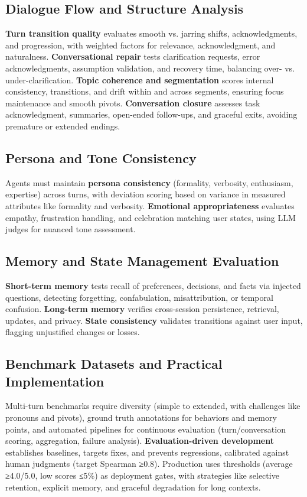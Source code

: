 \begin{TNtwocol}
\subsection*{Dialogue Flow and Structure Analysis}

\textbf{Turn transition quality} evaluates smooth vs. jarring shifts, acknowledgments, and progression, with weighted factors for relevance, acknowledgment, and naturalness. \textbf{Conversational repair} tests clarification requests, error acknowledgments, assumption validation, and recovery time, balancing over- vs. under-clarification. \textbf{Topic coherence and segmentation} scores internal consistency, transitions, and drift within and across segments, ensuring focus maintenance and smooth pivots. \textbf{Conversation closure} assesses task acknowledgment, summaries, open-ended follow-ups, and graceful exits, avoiding premature or extended endings.
​

\subsection*{Persona and Tone Consistency}

Agents must maintain \textbf{persona consistency} (formality, verbosity, enthusiasm, expertise) across turns, with deviation scoring based on variance in measured attributes like formality and verbosity. \textbf{Emotional appropriateness} evaluates empathy, frustration handling, and celebration matching user states, using LLM judges for nuanced tone assessment.
​

\subsection*{Memory and State Management Evaluation}

\textbf{Short-term memory} tests recall of preferences, decisions, and facts via injected questions, detecting forgetting, confabulation, misattribution, or temporal confusion. \textbf{Long-term memory} verifies cross-session persistence, retrieval, updates, and privacy. \textbf{State consistency} validates transitions against user input, flagging unjustified changes or losses.
​

\subsection*{Benchmark Datasets and Practical Implementation}

Multi-turn benchmarks require diversity (simple to extended, with challenges like pronouns and pivots), ground truth annotations for behaviors and memory points, and automated pipelines for continuous evaluation (turn/conversation scoring, aggregation, failure analysis). \textbf{Evaluation-driven development} establishes baselines, targets fixes, and prevents regressions, calibrated against human judgments (target Spearman ≥0.8). Production uses thresholds (average ≥4.0/5.0, low scores ≤5\%) as deployment gates, with strategies like selective retention, explicit memory, and graceful degradation for long contexts.
​

\end{TNtwocol}
